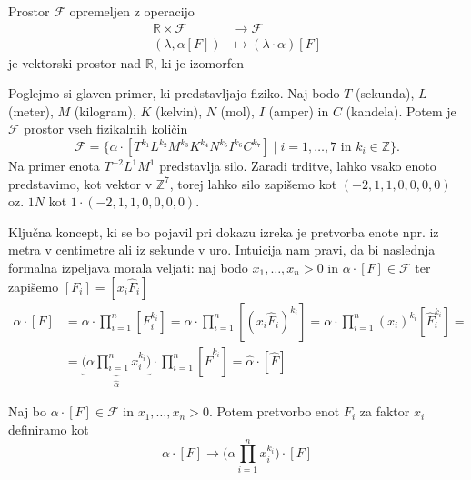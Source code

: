 \documentclass[mat2, tisk]{fmfdelo}
\newcommand{\R}{\mathbb R}
\newcommand{\Z}{\mathbb Z}
\begin{document}
\begin{trditev}
Prostor $\mathcal{F}$ opremeljen z operacijo 
\begin{align*}
\R \times \mathcal{F} &\rightarrow \mathcal{F} \\
(\lambda, \alpha[F]) &\mapsto (\lambda \cdot \alpha)[F]
\end{align*}
je vektorski prostor nad $\R$, ki je izomorfen 
\end{trditev}

\begin{primer}
 Poglejmo si glaven primer, ki predstavljajo fiziko. Naj bodo 
 $T$ (sekunda), $L$ (meter), $M$ (kilogram), $K$ (kelvin), $N$ (mol), $I$ (amper) in $C$ (kandela).
 Potem je $\mathcal{F}$ prostor vseh fizikalnih količin
 $$
 \mathcal{F} = \{\alpha \cdot [T^{k_1} L^{k_2} M^{k_3} K^{k_4} N^{k_5} I^{k_6} C^{k_7}] \mid i = 1, \dots, 7 \text{ in } k_i \in \Z\}.
 $$
 Na primer enota $T^{-2}L^1M^1$ predstavlja silo. Zaradi trditve, lahko 
 vsako enoto predstavimo, kot vektor v $\Z^7$, torej lahko silo zapišemo kot 
 $(-2, 1, 1, 0, 0, 0, 0)$ oz. $1N$ kot $1 \cdot (-2, 1, 1, 0, 0, 0, 0)$.
 \end{primer}

Ključna koncept, ki se bo pojavil pri dokazu izreka je pretvorba enote npr.
iz metra v centimetre ali iz sekunde v uro. Intuicija nam pravi, da 
bi naslednja formalna izpeljava morala veljati: naj bodo $x_1, \dots, x_n > 0$ in 
$\alpha\cdot[F]\in \mathcal{F}$ ter zapišemo $[F_i] = [x_i \hat{F}_i]$
\begin{align*}
\alpha \cdot [F] &= \alpha\cdot \prod_{i=1}^n [F_i^{k_i}] = 
\alpha\cdot \prod_{i=1}^n [(x_i\hat{F}_i)^{k_i}] = 
\alpha\cdot \prod_{i=1}^n (x_i)^{k_i} [\hat{F}_i^{k_i}] = \\
&= \underbrace{\Big(\alpha\prod_{i=1}^n x_i^{k_i}\Big)}_{\hat{\alpha}} \cdot \prod_{i=1}^n [\hat{F}^{k_i}] = \hat{\alpha}\cdot [\hat{F}]
\end{align*}

\begin{definicija}
Naj bo $\alpha\cdot [F] \in \mathcal{F}$ in $x_1, \dots, x_n > 0$. Potem 
pretvorbo enot $F_i$ za faktor $x_i$ definiramo kot 
\begin{equation}
 \alpha\cdot [F] \rightarrow \Big(\alpha\prod_{i=1}^n x_i^{k_i}\Big)\cdot [F]
\end{equation}
\end{definicija}
\end{document}
